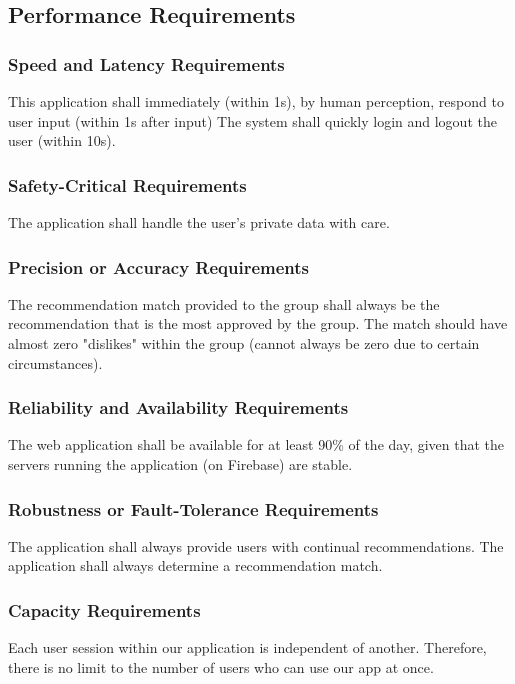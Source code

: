 \documentclass[12pt]{article}
\begin{document}
\subsection{Performance Requirements}

\subsubsection{Speed and Latency Requirements}
This application shall immediately (within 1s), by human perception, respond to user input (within 1s after input) The system shall quickly login and logout the user (within 10s).

\subsubsection{Safety-Critical Requirements}
The application shall handle the user's private data with care. 

\subsubsection{Precision or Accuracy Requirements}
The recommendation match provided to the group shall always be the recommendation that is the most approved by the group. The match should have almost zero "dislikes" within the group (cannot always be zero due to certain circumstances). 

\subsubsection{Reliability and Availability Requirements}
The web application shall be available for at least 90\% of the day, given that the servers running the application (on Firebase) are stable.

\subsubsection{Robustness or Fault-Tolerance Requirements}
The application shall always provide users with continual recommendations. The application shall always determine a recommendation match.

\subsubsection{Capacity Requirements}
Each user session within our application is independent of another. Therefore, there is no limit to the number of users who can use our app at once.
\end{document}
